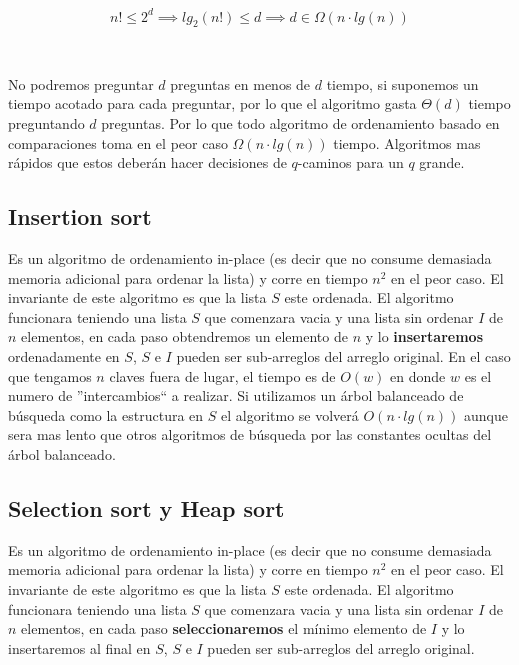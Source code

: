 \documentclass[10pt, a4paper]{report}
\begin{document}
\begin{equation*}
 n! \leq 2^d \implies lg_2(n!) \leq d \implies d \in \Omega(n \cdot lg(n))
\end{equation*}

~

No podremos preguntar $d$ preguntas en menos de $d$ tiempo, si suponemos un tiempo acotado para cada preguntar, por lo que el algoritmo gasta $\Theta(d)$ tiempo preguntando $d$ preguntas. Por lo que todo algoritmo de ordenamiento basado en comparaciones toma en el peor caso $\Omega(n \cdot lg(n))$ tiempo. Algoritmos mas r\'apidos que estos deber\'an hacer decisiones de $q$-caminos para un $q$ grande.

\subsection{Insertion sort}

Es un algoritmo de ordenamiento in-place (es decir que no consume demasiada memoria adicional para ordenar la lista) y corre en tiempo $n^2$ en el peor caso. El invariante de este algoritmo es que la lista $S$ este ordenada. El algoritmo funcionara teniendo una lista $S$ que comenzara vacia y una lista sin ordenar $I$ de $n$ elementos, en cada paso obtendremos un elemento de $n$ y lo \textbf{insertaremos} ordenadamente en $S$, $S$ e $I$ pueden ser sub-arreglos del arreglo original. En el caso que tengamos $n$ claves fuera de lugar, el tiempo es de $O(w)$ en donde $w$ es el numero de ''intercambios`` a realizar. Si utilizamos un \'arbol balanceado de b\'usqueda como la estructura en $S$ el algoritmo se volver\'a $O(n\cdot lg(n))$ aunque sera mas lento que otros algoritmos de b\'usqueda por las constantes ocultas del \'arbol balanceado.

\subsection{Selection sort y Heap sort} 

Es un algoritmo de ordenamiento in-place (es decir que no consume demasiada memoria adicional para ordenar la lista) y corre en tiempo $n^2$ en el peor caso. El invariante de este algoritmo es que la lista $S$ este ordenada. El algoritmo funcionara teniendo una lista $S$ que comenzara vacia y una lista sin ordenar $I$ de $n$ elementos, en cada paso \textbf{seleccionaremos} el m\'inimo elemento de $I$ y lo insertaremos al final en $S$, $S$ e $I$ pueden ser sub-arreglos del arreglo original.
\end{document}
